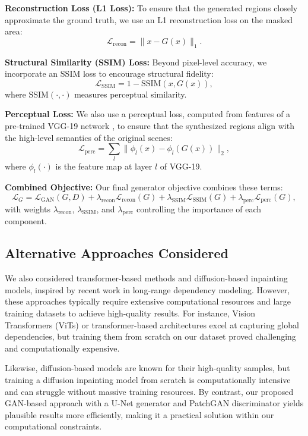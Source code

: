 \documentclass[sigconf]{acmart}
\begin{document}
\noindent\textbf{Reconstruction Loss (L1 Loss):}  
To ensure that the generated regions closely approximate the ground truth, we use an L1 reconstruction loss on the masked area:
\[
\mathcal{L}_{\text{recon}} = \| x - G(x) \|_1.
\]

\noindent\textbf{Structural Similarity (SSIM) Loss:}  
Beyond pixel-level accuracy, we incorporate an SSIM loss to encourage structural fidelity:
\[
\mathcal{L}_{\text{SSIM}} = 1 - \text{SSIM}(x, G(x)),
\]
where $\text{SSIM}(\cdot,\cdot)$ measures perceptual similarity.

\noindent\textbf{Perceptual Loss:}  
We also use a perceptual loss, computed from features of a pre-trained VGG-19 network \cite{Simonyan2015}, to ensure that the synthesized regions align with the high-level semantics of the original scenes:
\[
\mathcal{L}_{\text{perc}} = \sum_{l} \| \phi_l(x) - \phi_l(G(x)) \|_2,
\]
where $\phi_l(\cdot)$ is the feature map at layer $l$ of VGG-19.

\noindent\textbf{Combined Objective:}  
Our final generator objective combines these terms:
\[
\mathcal{L}_{G} = \mathcal{L}_{\text{GAN}}(G,D) + \lambda_{\text{recon}}\mathcal{L}_{\text{recon}}(G) + \lambda_{\text{SSIM}}\mathcal{L}_{\text{SSIM}}(G) + \lambda_{\text{perc}}\mathcal{L}_{\text{perc}}(G),
\]
with weights $\lambda_{\text{recon}}$, $\lambda_{\text{SSIM}}$, and $\lambda_{\text{perc}}$ controlling the importance of each component.

\subsection*{Alternative Approaches Considered}

We also considered transformer-based methods and diffusion-based inpainting models, inspired by recent work in long-range dependency modeling. However, these approaches typically require extensive computational resources and large training datasets to achieve high-quality results. For instance, Vision Transformers (ViTs) or transformer-based architectures excel at capturing global dependencies, but training them from scratch on our dataset proved challenging and computationally expensive.

Likewise, diffusion-based models are known for their high-quality samples, but training a diffusion inpainting model from scratch is computationally intensive and can struggle without massive training resources. By contrast, our proposed GAN-based approach with a U-Net generator and PatchGAN discriminator yields plausible results more efficiently, making it a practical solution within our computational constraints.
\end{document}
